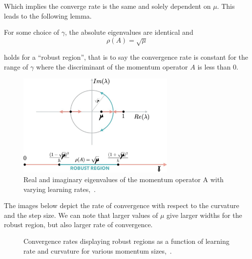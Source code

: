 \documentclass{article}
\begin{document}
Which implies the converge rate is the same and solely dependent on $\mu$. This leads to the following lemma.

\begin{lemma} 
For some choice of $\gamma$, the absolute eigenvalues are identical and
\[
\rho(A) = \sqrt{\mu}
\]

holds for a ``robust region'', that is to say the convergence rate is constant for the range of $\gamma$ where the discriminant of the momentum operator $A$ is less than 0.
\end{lemma}

\begin{figure}[H]%
\centering
\includegraphics[height=2in]{discriminator_analysis.pdf}%
\caption{Real and imaginary eigenvalues of the momentum operator A with varying learning rates,~\cite{mitliagkas2019interesting}.}
\label{fig:robust_region}%
\end{figure}


The images below depict the rate  of convergence with respect to the curvature and the step size. We can note that larger values of $\mu$ give larger widths for the robust region, but also larger rate of convergence.
\begin{figure}[H]%
\centering
{}%
\qquad
{}%
\caption{Convergence rates displaying robust regions as a function of learning rate and curvature for various momentum sizes,~\cite{mitliagkas2019interesting}.}
\end{figure}
\end{document}
